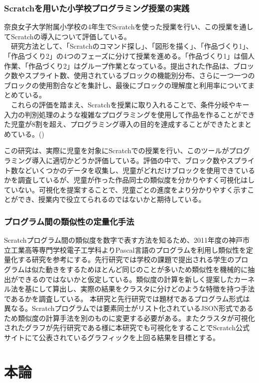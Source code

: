 \documentclass[a4paper,10pt,onecolumn,oneside,openany]{jsbook}
\begin{document}
\section{Scratchを用いた小学校プログラミング授業の実践}
奈良女子大学附属小学校の4年生でScratchを使った授業を行い、この授業を通してScratchの導入について評価している。
\\
　研究方法として、「Scratchのコマンド探し」、「図形を描く」、「作品づくり1」、「作品づくり2」の4つのフェーズに分けて授業を進める。「作品づくり1」は個人作業、「作品づくり2」はグループ作業となっている。提出された作品は、ブロック数やスプライト数、使用されているブロックの機能別分布、さらに一つ一つのブロックの使用割合などを集計し、最後にブロックの理解度と利用率についてまとめている。
\\
　これらの評価を踏まえ、Scratchを授業に取り入れることで、条件分岐やキー入力の判別処理のような複雑なプログラミングを使用して作品を作ることができた児童が8割を超え、プログラミング導入の目的を達成することができたとまとめている。(\cite{preEssay1})

この研究は、実際に児童を対象にScratchでの授業を行い、このツールがプログラミング導入に適切かどうか評価している。評価の中で、ブロック数やスプライト数などいくつかのデータを収集し、児童がどれだけブロックを使用できているかを調査しているが、児童が作った作品同士の類似度を分かりやすく可視化はしていない。可視化を提案することで、児童ごとの進度をより分かりやすく示すことができ、授業内で役立てられるのではないかと期待している。
\section{プログラム間の類似性の定量化手法}
Scratchプログラム間の類似度を数字で表す方法を知るため、2011年度の神戸市立工業高等専門学校電子工学科よりPascal言語のプログラムを利用し類似性を定量化する研究を参考にする。先行研究では学校の課題で提出される学生のプログラムは似た動きをするためほとんど同じのことが多いため類似性を機械的に抽出ができるのではないかと仮定している。類似度の計算を新しく提案したカーネル法を基にして算出し、実際の結果をクラスタに分けどのような特徴を持つ手法であるかを調査している。\cite{preEssay2}
本研究と先行研究では題材であるプログラム形式は異なる。Scratchプログラムでは要素同士がリスト化されているJSON形式であるため類似度の計算手法を別のものに変更する必要がある。またクラスタが可視化されたグラフが先行研究である様に本研究でも可視化をすることでScratch公式サイトにて公表されているグラフィックを上回る結果を目標とする。



\part{本論}
\end{document}
